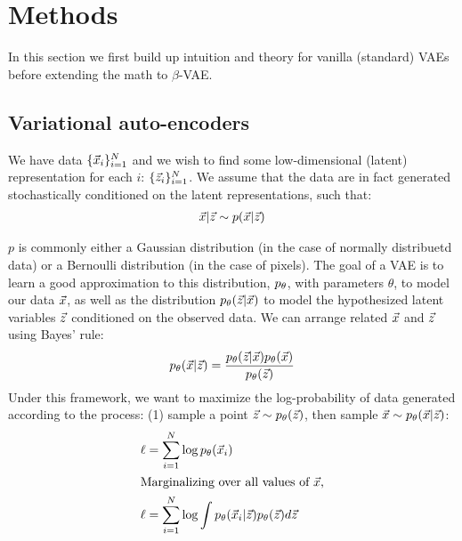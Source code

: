 \section{Methods}

In this section we first build up intuition and theory for vanilla (standard) VAEs before extending the math to $\beta$-VAE.

\subsection{Variational auto-encoders}

We have data $\{\vec{x}_i\}_{i=1}^N$ and we wish to find some low-dimensional (latent) representation for each $i$: $\{\vec{z}_i\}_{i=1}^N$. We assume that the data are in fact generated stochastically conditioned on the latent representations, such that:
\begin{align*}
    \vec{x}|\vec{z} \sim p(\vec{x}|\vec{z})
\end{align*}

$p$ is commonly either a Gaussian distribution (in the case of normally distribuetd data) or a Bernoulli distribution (in the case of pixels). The goal of a VAE is to learn a good approximation to this distribution, $p_\theta$, with parameters $\theta$, to model our data $\vec{x}$, as well as the distribution $p_\theta(\vec{z}|\vec{x})$ to model the hypothesized latent variables $\vec{z}$ conditioned on the observed data. We can arrange related $\vec{x}$ and $\vec{z}$ using Bayes' rule:
\begin{equation*}
    p_\theta(\vec{x}|\vec{z}) = \frac{p_\theta(\vec{z}|\vec{x})p_\theta(\vec{x})}{p_\theta(\vec{z})}
\end{equation*}
Under this framework, we want to maximize the log-probability of data generated according to the process: (1) sample a point $\vec{z}\sim p_\theta(\vec{z})$, then sample $\vec{x}\sim p_\theta(\vec{x}|\vec{z})$:
\begin{align*}
    \ell &=\sum_{i=1}^N\log p_\theta(\vec{x}_i) \\
    \intertext{Marginalizing over all values of $\vec{x}$,}
    \ell&=\sum_{i=1}^N\log\int p_\theta(\vec{x}_i|\vec{z})p_\theta(\vec{z})d\vec{z}
\end{align*}


